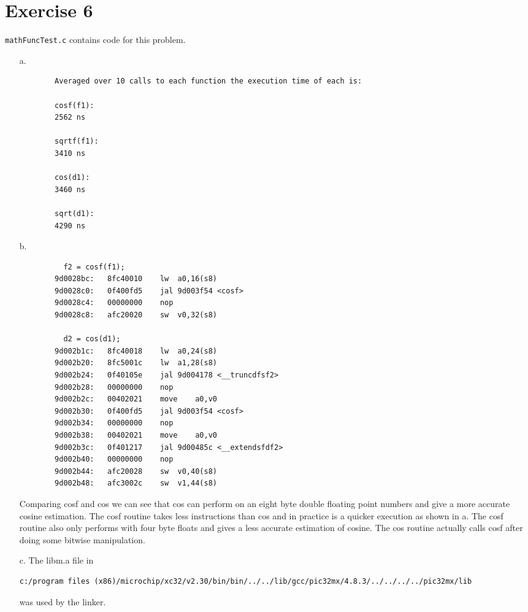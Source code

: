 \documentclass[12pt]{article}
\begin{document}
\section*{Exercise 6}
\verb|mathFuncTest.c| contains code for this problem.
\begin{itemize}
    \item[a.]
    \begin{verbatim}
        Averaged over 10 calls to each function the execution time of each is:

        cosf(f1):
        2562 ns

        sqrtf(f1):
        3410 ns

        cos(d1):
        3460 ns

        sqrt(d1):
        4290 ns

    \end{verbatim}

    \item[b.]
    \begin{verbatim}
          f2 = cosf(f1);
        9d0028bc:	8fc40010 	lw	a0,16(s8)
        9d0028c0:	0f400fd5 	jal	9d003f54 <cosf>
        9d0028c4:	00000000 	nop
        9d0028c8:	afc20020 	sw	v0,32(s8)

          d2 = cos(d1);
        9d002b1c:	8fc40018 	lw	a0,24(s8)
        9d002b20:	8fc5001c 	lw	a1,28(s8)
        9d002b24:	0f40105e 	jal	9d004178 <__truncdfsf2>
        9d002b28:	00000000 	nop
        9d002b2c:	00402021 	move	a0,v0
        9d002b30:	0f400fd5 	jal	9d003f54 <cosf>
        9d002b34:	00000000 	nop
        9d002b38:	00402021 	move	a0,v0
        9d002b3c:	0f401217 	jal	9d00485c <__extendsfdf2>
        9d002b40:	00000000 	nop
        9d002b44:	afc20028 	sw	v0,40(s8)
        9d002b48:	afc3002c 	sw	v1,44(s8)
    \end{verbatim}
    Comparing cosf and cos we can see that cos can perform on an eight byte double floating point numbers and give a more accurate cosine estimation.
    The cosf routine takes less instructions than cos and in practice is a quicker execution as shown in a.
    The cosf routine also only performs with four byte floats and gives a less accurate estimation of cosine.
    The cos routine actually calls cosf after doing some bitwise manipulation.

    \item[c.]
    The libm.a file in 
    
    \begin{lstlisting}[breaklines]
    c:/program files (x86)/microchip/xc32/v2.30/bin/bin/../../lib/gcc/pic32mx/4.8.3/../../../../pic32mx/lib
    \end{lstlisting}

    was used by the linker.
\end{itemize}
\end{document}
